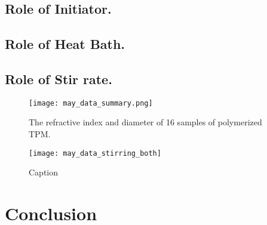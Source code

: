 \subsection{Role of Initiator.}

\subsection{Role of Heat Bath.}

\subsection{Role of Stir rate.}


\begin{figure}
    \centering
    \texttt{[image: may\_data\_summary.png]}
    \caption{The refractive index and diameter of 16 samples of 
    polymerized TPM.}
    \label{fig:initiator_data}
\end{figure}

\begin{figure}
    \centering
    \texttt{[image: may\_data\_stirring\_both]}
    \caption{Caption}
    \label{fig:stir_rate}
\end{figure}


\section{Conclusion}
